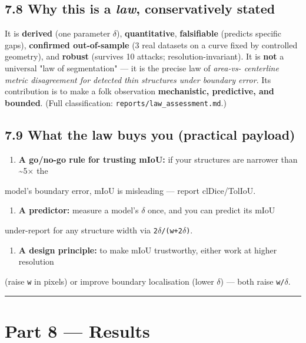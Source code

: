 \documentclass[11pt]{article}
\begin{document}
\subsection*{7.8 Why this is a \textit{law}, conservatively stated}

It is \textbf{derived} (one parameter \texttt{$\delta$}), \textbf{quantitative}, \textbf{falsifiable} (predicts specific gaps), \textbf{confirmed out-of-sample} (3 real datasets on a curve fixed by controlled geometry), and \textbf{robust} (survives 10 attacks; resolution-invariant). It is \textbf{not} a universal "law of segmentation" --- it is the precise law of \textit{area-vs- centerline metric disagreement for detected thin structures under boundary error}. Its contribution is to make a folk observation \textbf{mechanistic, predictive, and bounded}. (Full classification: \texttt{reports/law\_assessment.md}.)

\subsection*{7.9 What the law buys you (practical payload)}

\begin{enumerate}\setlength{\itemsep}{1pt}
\item \textbf{A go/no-go rule for trusting mIoU:} if your structures are narrower than \textasciitilde{}5$\times$ the
\end{enumerate}
   model's boundary error, mIoU is misleading --- report clDice/TolIoU.
\begin{enumerate}\setlength{\itemsep}{1pt}
\item \textbf{A predictor:} measure a model's \texttt{$\delta$} once, and you can predict its mIoU
\end{enumerate}
   under-report for any structure width via \texttt{2$\delta$/(w+2$\delta$)}.
\begin{enumerate}\setlength{\itemsep}{1pt}
\item \textbf{A design principle:} to make mIoU trustworthy, either work at higher resolution
\end{enumerate}
   (raise \texttt{w} in pixels) or improve boundary localisation (lower \texttt{$\delta$}) --- both raise    \texttt{w/$\delta$}.

\vspace{3pt}\hrule\vspace{3pt}
\clearpage\section*{Part 8 --- Results}
\end{document}
